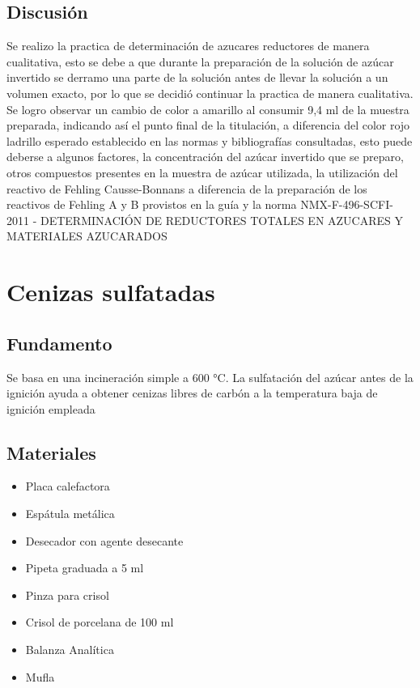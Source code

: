 \documentclass[a4paper,12pt]{article} %
\begin{document}
\subsection{Discusión}
Se realizo la practica de determinación de azucares reductores de manera cualitativa, esto se debe a que durante la preparación de la solución de azúcar invertido se derramo una parte de la solución antes de llevar la solución a un volumen exacto, por lo que se decidió continuar la practica de manera cualitativa. Se logro observar un cambio de color a amarillo al consumir 9,4 ml de la muestra preparada, indicando así el punto final de la titulación, a diferencia del color rojo ladrillo esperado establecido en las normas y bibliografías consultadas, esto puede deberse a algunos factores, la concentración del azúcar invertido que se preparo, otros compuestos presentes en la muestra de azúcar utilizada, la utilización del reactivo de Fehling Causse-Bonnans a diferencia de la preparación de los reactivos de Fehling A y B provistos en la guía y la norma NMX-F-496-SCFI-2011 - DETERMINACIÓN DE REDUCTORES TOTALES EN AZUCARES Y MATERIALES AZUCARADOS



\newpage

\section{Cenizas sulfatadas}

\subsection{Fundamento}
Se basa en una incineración simple a 600 °C. La sulfatación del azúcar antes de la ignición ayuda a obtener cenizas libres de carbón a la temperatura baja de ignición empleada

\subsection{Materiales} 
\begin{itemize}
    \item{Placa calefactora }
    \item{Espátula metálica}
    \item{Desecador con agente desecante}
    \item{Pipeta graduada a 5 ml}
    \item{Pinza para crisol}
    \item{Crisol de porcelana de 100 ml}
    \item{Balanza Analítica}  
    \item{Mufla}
\end{itemize}
\end{document}
